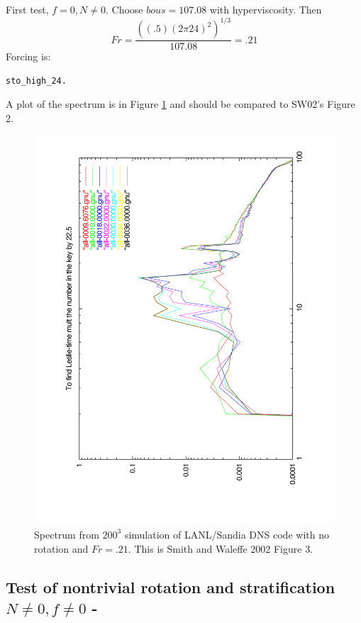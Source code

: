 \documentclass[12pt]{article}
\begin{document}
First test, $f=0, N\ne0$. Choose $bous=107.08$ with hyperviscosity. Then
\begin{equation}
Fr = \frac{\left((.5)(2 \pi 24)^{2}\right)^{1/3}}{107.08}= .21
\end{equation} 
Forcing is: 
\begin{verbatim}
sto_high_24.
\end{verbatim}
A plot of the spectrum is in Figure \ref{fig:norot} and should be
compared to SW02's Figure 2.
\begin{figure}
\begin{center}
\includegraphics[angle=-90,width=6.in]{frp21}
\caption{Spectrum from $200^3$ simulation of LANL/Sandia DNS code with
  no rotation and $Fr=.21$. This is Smith and Waleffe 2002 Figure 3.}
\label{fig:norot}
\end{center}
\end{figure}

\subsection{Test of nontrivial rotation and stratification $N\ne0, f\ne0$ - }
\end{document}
